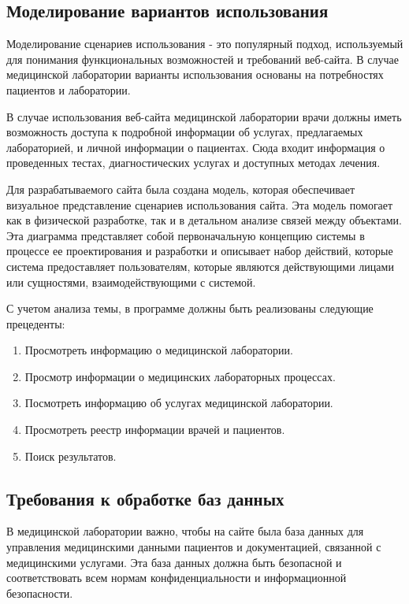 \subsection{Моделирование вариантов использования}

Моделирование сценариев использования - это популярный подход, используемый для понимания функциональных возможностей и требований веб-сайта. В случае медицинской лаборатории варианты использования основаны на потребностях пациентов и лаборатории.

В случае использования веб-сайта медицинской лаборатории врачи должны иметь возможность доступа к подробной информации об услугах, предлагаемых лабораторией, и личной информации о пациентах. Сюда входит информация о проведенных тестах, диагностических услугах и доступных методах лечения. 

Для разрабатываемого сайта была создана модель, которая обеспечивает визуальное представление сценариев использования сайта.
Эта модель помогает как в физической разработке, так и в детальном анализе связей между объектами.
Эта диаграмма представляет собой первоначальную концепцию системы в процессе ее проектирования и разработки и описывает набор действий, которые система предоставляет пользователям, которые являются действующими лицами или сущностями, взаимодействующими с системой.

С учетом анализа темы, в программе должны быть реализованы следующие прецеденты:
\begin{enumerate}
\item Просмотреть информацию о медицинской лаборатории.
\item Просмотр информации о медицинских лабораторных процессах.
\item Посмотреть информацию об услугах медицинской лаборатории.
\item Просмотреть реестр информации врачей и пациентов.
\item Поиск результатов.
\end{enumerate}

\subsection{Требования к обработке баз данных}

В медицинской лаборатории важно, чтобы на сайте была база данных для управления медицинскими данными пациентов и документацией, связанной с медицинскими услугами. Эта база данных должна быть безопасной и соответствовать всем нормам конфиденциальности и информационной безопасности.


